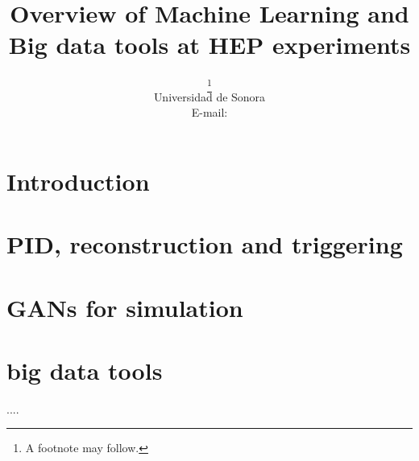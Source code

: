 \documentclass{PoS}
\title{Overview of Machine Learning and Big data tools at HEP experiments}
\author{\speaker{A. Castaneda}\thanks{A footnote may follow.}\\
        Universidad de Sonora\\
        E-mail: \email{castaned@cern.ch}}
\begin{document}
\section{Introduction}





\section{PID, reconstruction and triggering}

\section{GANs for simulation}

\section{big data tools}

\begin{thebibliography}{99}
....

\end{thebibliography}
\end{document}
